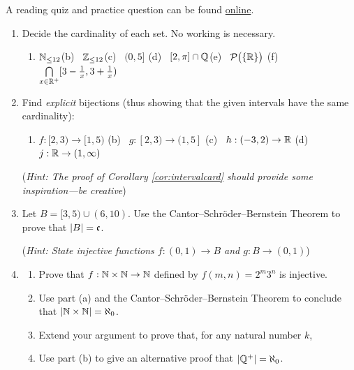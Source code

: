 \begin{exercises}{}{}
	A reading quiz and practice question can be found \href{http://www.math.uci.edu/~ndonalds/math13/selftest/8-2-uncountable.html}{online}.

	\begin{enumerate}
	  \item Decide the cardinality of each set. No working is necessary.
	  \begin{enumerate}
	    \item $\mathbb{N}_{\le 12}$\hfill (b) \ $\mathbb{Z}_{\le 12}$\hfill (c) \ $(0,5]$\hfill 
	    (d) \ $[2,\pi]\cap\mathbb{Q}$\hfill (e) \ $\mathcal{P}\bigl(\{\mathbb{R}\}\bigr)$ \hfill 
	    (f) \ $\bigcap\limits_{x\in\mathbb{R}^+}[3-\frac 1x,3+\frac 1x)$
	  \end{enumerate}
	  
	  
	  \item Find \emph{explicit} bijections (thus showing that the given intervals have the same cardinality):
	  \begin{enumerate}
	    \item $f:[2,3)\to [1,5)$ \qquad (b) \ $g:[2,3)\to (1,5]$\qquad 
	    (c) \ $h:(-3,2)\to\mathbb{R}$ \qquad (d) \ $j:\mathbb{R}\to(1,\infty)$
	  \end{enumerate}
	  (\emph{Hint: The proof of Corollary \ref{cor:intervalcard} should provide some inspiration---be creative}) 
  
  
  	\item Let $B=[3,5)\cup(6,10)$. Use the Cantor--Schröder--Bernstein Theorem to prove that $\left| B\right|=\mathfrak{c}$.\par
  	(\emph{Hint: State injective functions $f:(0,1)\to B$ and $g:B\to(0,1)$})
  	
  	
  	\goodbreak
  	
  	
  	\item\begin{enumerate}
  		\item Prove that $f:\mathbb{N}\times\mathbb{N}\to\mathbb{N}$ defined by $f(m,n)=2^m3^n$ is injective.
  		\item Use part (a) and the Cantor--Schröder--Bernstein Theorem to conclude that $\left| \mathbb{N}\times\mathbb{N}\right|=\aleph_0$.
  		\item Extend your argument to prove that, for any natural number $k$,	
  		\item Use part (b) to give an alternative proof that $\left| \mathbb{Q}^+\right|=\aleph_0$.
  	\end{enumerate}
  	

\end{enumerate}
\end{exercises}
